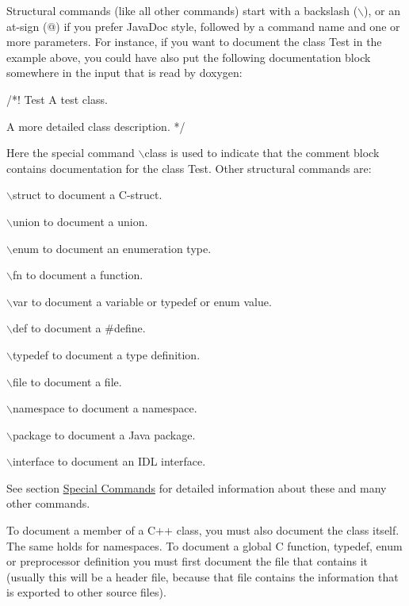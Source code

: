 Structural commands (like all other commands) start with a backslash ({\ttfamily $\backslash$}), or an at-\/sign ({\ttfamily @}) if you prefer JavaDoc style, followed by a command name and one or more parameters. For instance, if you want to document the class {\ttfamily Test} in the example above, you could have also put the following documentation block somewhere in the input that is read by doxygen: \begin{DoxyVerb}
/*! \class Test
    \brief A test class.

    A more detailed class description.
*/
\end{DoxyVerb}


Here the special command {\ttfamily $\backslash$class} is used to indicate that the comment block contains documentation for the class {\ttfamily Test}. Other structural commands are: 
\begin{DoxyItemize}
\item {\ttfamily $\backslash$struct} to document a C-\/struct. 
\item {\ttfamily $\backslash$union} to document a union. 
\item {\ttfamily $\backslash$enum} to document an enumeration type. 
\item {\ttfamily $\backslash$fn} to document a function. 
\item {\ttfamily $\backslash$var} to document a variable or typedef or enum value. 
\item {\ttfamily $\backslash$def} to document a \#define. 
\item {\ttfamily $\backslash$typedef} to document a type definition. 
\item {\ttfamily $\backslash$file} to document a file. 
\item {\ttfamily $\backslash$namespace} to document a namespace. 
\item {\ttfamily $\backslash$package} to document a Java package. 
\item {\ttfamily $\backslash$interface} to document an IDL interface. 
\end{DoxyItemize}See section \hyperlink{commands}{Special Commands} for detailed information about these and many other commands.

To document a member of a C++ class, you must also document the class itself. The same holds for namespaces. To document a global C function, typedef, enum or preprocessor definition you must first document the file that contains it (usually this will be a header file, because that file contains the information that is exported to other source files).

